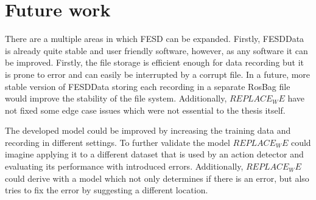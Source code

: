 \section{Future work}
\label{sec:future_work}

There are a multiple areas in which FESD can be expanded. Firstly, FESDData is already quite stable and user friendly software, however, as any software it can be improved. Firstly, the file storage is efficient enough for data recording but it is prone to error and can easily be interrupted by a corrupt file. In a future, more stable version of FESDData storing each recording in a separate RosBag file would improve the stability of the file system. Additionally, $REPLACE_WE$ have not fixed some edge case issues which were not essential to the thesis itself.

The developed model could be improved by increasing the training data and recording in different settings. To further validate the model $REPLACE_WE$ could imagine applying it to a different dataset that is used by an action detector and evaluating its performance with introduced errors. Additionally, $REPLACE_WE$ could derive with a model which not only determines if there is an error, but also tries to fix the error by suggesting a different location.
